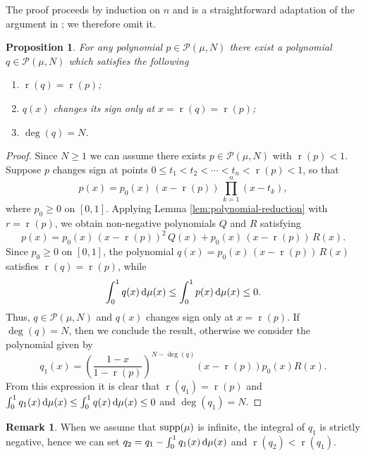 \documentclass[reqno, a4paper]{amsart}
\def\supp{{\rm supp}}
\renewcommand{\d}{\text{\rm d}}
\renewcommand{\r}{\operatorname{r}}
\theoremstyle{plain}
\newtheorem{proposition}[theorem]{Proposition}
\theoremstyle{definition}
\theoremstyle{remarkstyle}
\newtheorem*{remark}{Remark}
\numberwithin{equation}{section}
\begin{document}
The proof proceeds by induction on $n$ and is a straightforward adaptation of the argument in \cite[Proposition 11]{Carneiro2024SignUncertaintyBrangesSpaces}; we therefore omit it.


\begin{proposition}\label{prop:reduction-to-single-sign-change}
    For any polynomial $p\in\mathcal{P}(\mu, N)$ there exist a polynomial $q\in \mathcal{P}(\mu, N)$ which satisfies the following
    \begin{enumerate}[label=\textnormal{(\roman*)}]
        \item $\r(q)=\r(p)$;
        \item $q(x)$ changes its sign only at $x=\r(q)=\r(p)$;
        \item $\deg(q)=N$.
    \end{enumerate}
\end{proposition}

\begin{proof}
Since $N\geq 1$ we can assume there exists $p\in \mathcal{P}(\mu, N)$ with $\r(p)<1$. Suppose $p$ changes sign at points $0 \leq t_1 < t_2 < \cdots < t_n < \r(p) < 1$, so that
\begin{equation*}
    p(x) = p_0(x)\,(x - \r(p))\,\prod_{k=1}^{n}(x - t_k),
\end{equation*}
where $p_0 \geq 0$ on $[0, 1]$. Applying Lemma \ref{lem:polynomial-reduction} with $r = \r(p)$, we obtain non-negative polynomials $Q$ and $R$ satisfying
\begin{equation*}
    p(x) = p_0(x)\,(x - \r(p))^2\,Q(x) + p_0(x)\,(x - \r(p))\,R(x).
\end{equation*}
Since $p_0 \geq 0$ on $[0,1]$, the polynomial $q(x) = p_0(x)\,(x - \r(p))\,R(x)$ satisfies $\r(q) = \r(p)$, while
\begin{equation*}
    \int_{0}^{1} q(x)\, \d\mu(x) \leq \int_{0}^{1} p(x)\, \d\mu(x) \leq 0.
\end{equation*}
Thus, $q\in \mathcal{P}(\mu, N)$ and $q(x)$ changes sign only at $x=\r(p)$.
If $\deg(q)=N$, then we conclude the result, otherwise we consider the polynomial given by
    \begin{equation*}
        q_1(x)=\left(\frac{1-x}{1-\r(p)}\right)^{N-\deg(q)} (x-\r(p)) p_0(x) R(x).
    \end{equation*}
From this expression it is clear that $\r(q_1)=\r(p)$ and $\int_{0}^{1} q_1(x)\, \d\mu(x)\leq \int_{0}^{1} q(x)\,\d\mu(x)\leq 0$ and $\deg(q_1)=N$.
\end{proof}
\begin{remark}
    When we assume that $\supp(\mu)$ is infinite, the integral of $q_1$ is strictly negative, hence we can set $q_2=q_1-\int_0^1 q_1(x)\,\d\mu(x)$ and $\r(q_2)<\r(q_1)$.
\end{remark}
\end{document}
